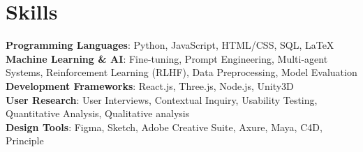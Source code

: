 \section{Skills}
    \begin{itemize}[leftmargin=0.15in, label={}]
	\small{\item{
		\textbf{Programming Languages}{: Python, JavaScript, HTML/CSS, SQL, LaTeX} \\ 
        \textbf{Machine Learning \& AI}{: Fine-tuning, Prompt Engineering, Multi-agent Systems, Reinforcement Learning (RLHF), Data Preprocessing, Model Evaluation} \\
		\textbf{Development Frameworks}{: React.js, Three.js, Node.js, Unity3D} \\
        \textbf{User Research}{: User Interviews, Contextual Inquiry, Usability Testing, Quantitative Analysis, Qualitative analysis} \\
        \textbf{Design Tools}{: Figma, Sketch, Adobe Creative Suite, Axure, Maya, C4D, Principle}
	}}
    \end{itemize}